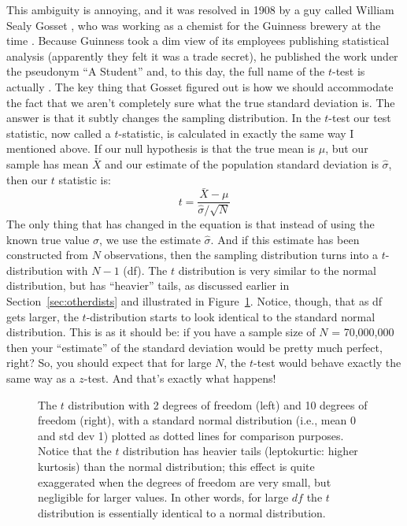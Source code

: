 
This ambiguity is annoying, and it was resolved in 1908 by a guy called William Sealy Gosset \parencite{Student1908}, who was working as a chemist for the Guinness brewery at the time \parencite[see][]{Box1987}. Because Guinness took a dim view of its employees publishing statistical analysis (apparently they felt it was a trade secret), he published the work under the pseudonym ``A Student'' and, to this day, the full name of the $t$-test is actually . The key thing that Gosset figured out is how we should accommodate the fact that we aren't completely sure what the true standard deviation is. The answer is that it subtly changes the sampling distribution. In the $t$-test our test statistic, now called a $t$-statistic, is calculated in exactly the same way I mentioned above. If our null hypothesis is that the true mean is $\mu$, but our sample has mean $\bar{X}$ and our estimate of the population standard deviation is $\hat{\sigma}$, then our $t$ statistic is:
$$
t = \frac{\bar{X} - \mu}{\hat{\sigma}/\sqrt{N} }
$$
The only thing that has changed in the equation is that instead of using the known true value $\sigma$, we use the estimate $\hat{\sigma}$. And if this estimate has been constructed from $N$ observations, then the sampling distribution turns into a $t$-distribution with $N-1$  (df). The $t$ distribution is very similar to the normal distribution, but has ``heavier'' tails, as discussed earlier in Section~\ref{sec:otherdists} and illustrated in Figure~\ref{fig:ttestdist}. Notice, though, that as df gets larger, the $t$-distribution starts to look identical to the standard normal distribution. This is as it should be: if you have a sample size of $N$ = 70,000,000 then your ``estimate'' of the standard deviation would be pretty much perfect, right? So, you should expect that for large $N$, the $t$-test would behave exactly the same way as a $z$-test. And that's exactly what happens!  

\begin{figure}
\begin{center}
\caption{The $t$ distribution with 2 degrees of freedom (left) and 10 degrees of freedom (right), with a standard normal distribution (i.e., mean 0 and std dev 1) plotted as dotted lines for comparison purposes. Notice that the $t$ distribution has heavier tails (leptokurtic: higher kurtosis) than the normal distribution; this effect is quite exaggerated when the degrees of freedom are very small, but negligible for larger values. In other words, for large $df$ the $t$ distribution is essentially identical to a normal distribution.}
\HR
\label{fig:ttestdist}
\end{center}
\end{figure}

